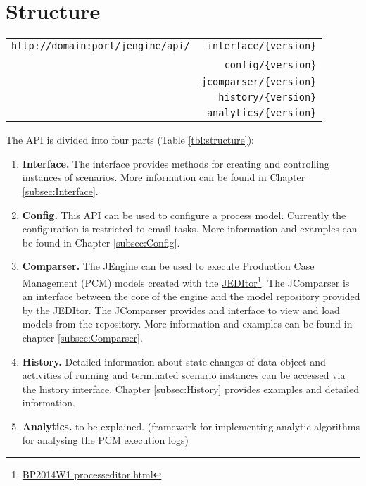 \documentclass[paper=a4]{scrartcl}
\begin{document}
\section{Structure}
    \begin{centering}
		\label{tbl:structure}
		\centering
		\begin{tabular}{r|r}
			\texttt{http://domain:port/jengine/api/}&\texttt{interface/\{version\}}\\
			&\texttt{config/\{version}\}\\
			&\texttt{jcomparser/\{version\}}\\
			&\texttt{history/\{version\}}\\
			&\texttt{analytics/\{version\}}
		\end{tabular}
	\end{centering}
	The API is divided into four parts (Table \ref{tbl:structure}):
	\begin{enumerate}
		\item \textbf{Interface.}
			  The interface provides methods for creating and controlling instances of scenarios.
			  More information can be found in Chapter \ref{subsec:Interface}.
		\item \textbf{Config.}
			  This API can be used to configure a process model.
			  Currently the configuration is restricted to email tasks.
			  More information and examples can be found in Chapter \ref{subsec:Config}.
		\item \textbf{Comparser.}
			  The JEngine can be used to execute Production Case Management (PCM) models created with the \href{BP2014W1 processeditor.html}{JEDItor}\footnote{\url{BP2014W1 processeditor.html}}.
			  The JComparser is an interface between the core of the engine and the model repository provided by the JEDItor.
			  The JComparser provides and interface to view and load models from the repository.
			  More information and examples can be found in chapter \ref{subsec:Comparser}.
		\item \textbf{History.}
			  Detailed information about state changes of data object and activities of running and terminated scenario instances can be accessed via the history interface.
			  Chapter \ref{subsec:History} provides examples and detailed information.
	    \item \textbf{Analytics.}
			  to be explained. (framework for implementing analytic algorithms for analysing the PCM execution logs)
	\end{enumerate}


%

	 
\end{document}
